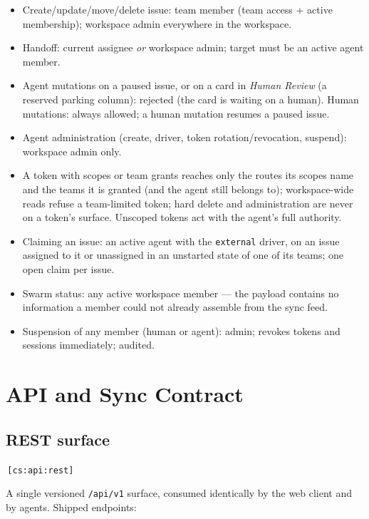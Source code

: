 \documentclass[11pt,a4paper]{report}
\newcommand{\cs}[1]{\,\texttt{\scriptsize[cs:#1]}\label{cs:#1}}
\begin{document}
\begin{itemize}
\item Create/update/move/delete issue: team member (team access + active
  membership); workspace admin everywhere in the workspace.
\item Handoff: current assignee \emph{or} workspace admin; target must be
  an active agent member.
\item Agent mutations on a paused issue, or on a card in \emph{Human
  Review} (a reserved parking column): rejected (the card is waiting on
  a human). Human mutations: always allowed; a human mutation resumes a
  paused issue.
\item Agent administration (create, driver, token rotation/revocation,
  suspend): workspace admin only.
\item A token with scopes or team grants reaches only the routes its
  scopes name and the teams it is granted (and the agent still belongs
  to); workspace-wide reads refuse a team-limited token; hard delete and
  administration are never on a token's surface. Unscoped tokens act
  with the agent's full authority.
\item Claiming an issue: an active agent with the \texttt{external}
  driver, on an issue assigned to it or unassigned in an unstarted state
  of one of its teams; one open claim per issue.
\item Swarm status: any active workspace member --- the payload contains
  no information a member could not already assemble from the sync feed.
\item Suspension of any member (human or agent): admin; revokes tokens
  and sessions immediately; audited.
\end{itemize}

\chapter{API and Sync Contract}
\label{ch:api}

\section{REST surface}
\cs{api:rest}

A single versioned \texttt{/api/v1} surface, consumed identically by the
web client and by agents. Shipped endpoints:
\end{document}
